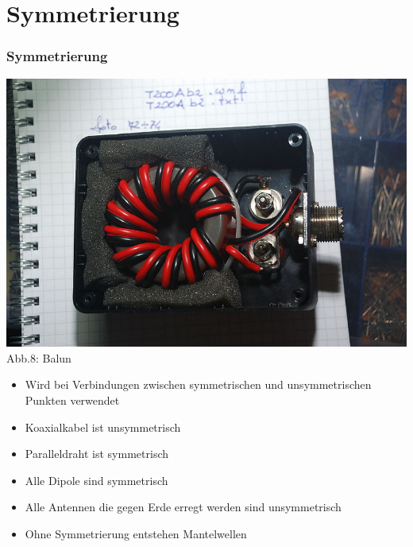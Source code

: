 \section*{Symmetrierung}
\begin{frame}
\frametitle{Symmetrierung}
\begin{minipage}{0.3\textwidth}
	\includegraphics[scale=0.5]{a10/balun.jpg}\\
	Abb.8: Balun \cite{wp}
\end{minipage}	
\hspace{2mm}
\begin{minipage}{0.5\textwidth}
	\begin{itemize}
		\item Wird bei Verbindungen zwischen symmetrischen und unsymmetrischen Punkten verwendet
		\item Koaxialkabel ist unsymmetrisch
		\item Paralleldraht ist symmetrisch
		\item Alle Dipole sind symmetrisch
		\item Alle Antennen die gegen Erde erregt werden sind unsymmetrisch
		\item	Ohne Symmetrierung entstehen Mantelwellen
	\end{itemize}
\end{minipage}
\end{frame}

